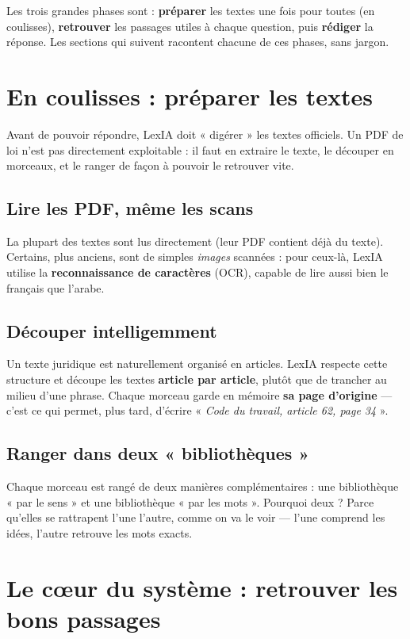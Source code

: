 \documentclass[11pt,a4paper]{article}
\begin{document}
Les trois grandes phases sont : \textbf{préparer} les textes une fois pour toutes (en coulisses),
\textbf{retrouver} les passages utiles à chaque question, puis \textbf{rédiger} la réponse. Les
sections qui suivent racontent chacune de ces phases, sans jargon.

\section{En coulisses : préparer les textes}

Avant de pouvoir répondre, LexIA doit « digérer » les textes officiels. Un PDF de loi n'est pas
directement exploitable : il faut en extraire le texte, le découper en morceaux, et le ranger de
façon à pouvoir le retrouver vite.

\subsection{Lire les PDF, même les scans}
La plupart des textes sont lus directement (leur PDF contient déjà du texte). Certains, plus anciens,
sont de simples \emph{images} scannées : pour ceux-là, LexIA utilise la \textbf{reconnaissance
de caractères} (OCR), capable de lire aussi bien le français que l'arabe.

\subsection{Découper intelligemment}
Un texte juridique est naturellement organisé en articles. LexIA respecte cette structure et découpe
les textes \textbf{article par article}, plutôt que de trancher au milieu d'une phrase. Chaque
morceau garde en mémoire \textbf{sa page d'origine} --- c'est ce qui permet, plus tard, d'écrire
« \textit{Code du travail, article 62, page 34} ».

\subsection{Ranger dans deux « bibliothèques »}
Chaque morceau est rangé de deux manières complémentaires : une bibliothèque « par le sens » et une
bibliothèque « par les mots ». Pourquoi deux ? Parce qu'elles se rattrapent l'une l'autre, comme on
va le voir --- l'une comprend les idées, l'autre retrouve les mots exacts.

\section{Le cœur du système : retrouver les bons passages}
\end{document}
